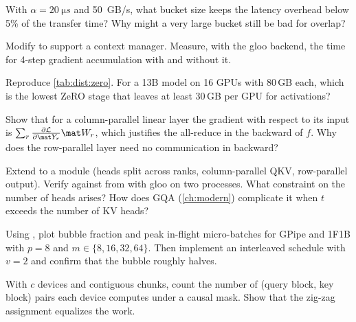 \begin{exercise}
With $\alpha=\SI{20}{\micro s}$ and \SI{50}{GB/s}, what bucket size keeps the latency overhead
below 5\% of the transfer time? Why might a very large bucket still be bad for overlap?
\end{exercise}

\begin{exercise}
Modify  to support a  context manager. Measure, with the
gloo backend, the time for 4-step gradient accumulation with and without it.
\end{exercise}

\begin{exercise}
Reproduce \cref{tab:dist:zero}. For a 13B model on 16 GPUs with 80\,GB each, which is the lowest
ZeRO stage that leaves at least 30\,GB per GPU for activations?
\end{exercise}

\begin{exercise}[TP backward]
Show that for a column-parallel linear layer the gradient with respect to its input is
$\sum_r \frac{\partial\mathcal L}{\partial \mat Y_r}\mat W_r$, which justifies the all-reduce in the
backward of $f$. Why does the row-parallel layer need no communication in backward?
\end{exercise}

\begin{exercise}
Extend  to a  module (heads split across
ranks, column-parallel QKV, row-parallel output). Verify against  from
 with gloo on two processes. What constraint on the number of heads arises?
How does GQA (\cref{ch:modern}) complicate it when $t$ exceeds the number of KV heads?
\end{exercise}

\begin{exercise}[Bubbles]
Using , plot bubble fraction and peak in-flight micro-batches for
GPipe and 1F1B with $p=8$ and $m\in\{8,16,32,64\}$. Then implement an interleaved schedule with
$v=2$ and confirm that the bubble roughly halves.
\end{exercise}

\begin{exercise}
With $c$ devices and contiguous chunks, count the number of (query block, key block) pairs each
device computes under a causal mask. Show that the zig-zag assignment equalizes the work.
\end{exercise}

